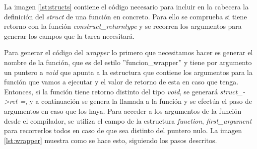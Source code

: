 La imagen \ref{lst:structs} contiene el código necesario para incluir en la cabecera la definición del \textit{struct} de una función en concreto. Para ello se comprueba si tiene retorno con la función \textit{construct\_returntype} y se recorren los argumentos para generar los campos que la tarea necesitará.
\bigskip

Para generar el código del \textit{wrapper} lo primero que necesitamos hacer es generar el nombre de la función, que es del estilo ''funcion\_wrapper'' y tiene por argumento un puntero a \textit{void} que apunta a la estructura que contiene los argumentos para la función que vamos a ejecutar y el valor de retorno de esta en caso que tenga. Entonces, si la función tiene retorno distinto del tipo \textit{void}, se generará \textit{struct\_->ret =}, y a continuación se genera la llamada a la función y se efectúa el paso de argumentos en caso que los haya. Para acceder a los argumentos de la función desde el compilador, se utiliza el campo de la estructura \textit{function}, \textit{first\_argument} para recorrerlos todos en caso de que sea distinto del puntero nulo. 
\smallskip
La imagen \ref{lst:wrapper} muestra como se hace esto, siguiendo los pasos descritos.
\smallskip
